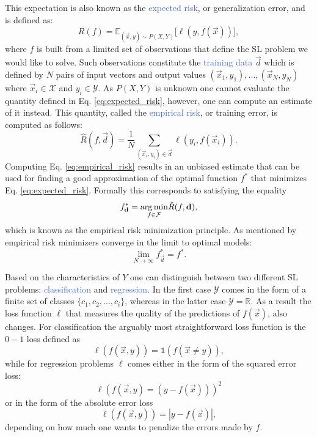 This expectation is also known as the \textcolor{RoyalBlue}{expected risk}, or generalization error, and is defined as:
\begin{equation}
	R(f) = \mathds{E}_{(\vec{x},y)\sim P(X,Y)} \big[\ell(y,f(\vec{x}))\big],
\end{equation}
\label{eq:expected_risk}
where $f$ is built from a limited set of observations that define the SL problem we would like to solve. Such observations constitute the \textcolor{RoyalBlue}{training data} $\vec{d}$ which is defined by $N$ pairs of input vectors and output values $(\vec{x}_1, y_1),...,(\vec{x}_N, y_N)$ where $\vec{x}_i \in \mathcal{X}$ and $y_i \in \mathcal{Y}$. As $P(X,Y)$ is unknown one cannot evaluate the quantity defined in Eq. \ref{eq:expected_risk}, however, one can compute an estimate of it instead. This quantity, called the \textcolor{RoyalBlue}{empirical risk}, or training error, is computed as follows:
\begin{equation}
	\hat{R}(f,\vec{d}) = \frac{1}{N} \sum_{(\vec{x}_i, y_i)\in \vec{d}} \ell(y_i,f(\vec{x}_i)).
\end{equation}
\label{eq:empirical_risk}
Computing Eq. \ref{eq:empirical_risk} results in an unbiased estimate that can be used for finding a good approximation of the optimal function $f^{*}$ that minimizes Eq. \ref{eq:expected_risk}. Formally this corresponds to satisfying the equality
\begin{equation}
	f^{*}_{\mathbf{d}} = \underset{f\in\mathcal{F}}{\operatorname*{arg\,min}}\hat{R}(f,\mathbf{d}),
\end{equation}
which is known as the empirical risk minimization principle. As mentioned by \citet{} empirical risk minimizers converge in the limit to optimal models:
\begin{equation}
	\lim_{N \to \infty} f^{*}_{\vec{d}} = f^{*}.
\end{equation}

Based on the characteristics of $Y$ one can distinguish between two different SL problems: \textcolor{RoyalBlue}{classification} and \textcolor{RoyalBlue}{regression}. In the first case $\mathcal{Y}$ comes in the form of a finite set of classes $\{c_1, c_2,...,c_i\}$, whereas in the latter case $\mathcal{Y}=\mathds{R}$. As a result the loss function $\ell$ that measures the quality of the predictions of $f(\vec{x})$, also changes. For classification the arguably most straightforward loss function is the $0-1$ loss defined as 
\begin{equation}
	\ell(f(\vec{x},y)) = \mathbb{1}(f(\vec{x}\neq y)),
\end{equation}
while for regression problems $\ell$ comes either in the form of the squared error loss:
\begin{equation}
	\ell(f(\vec{x},y)=(y-f(\vec{x})))^2
\end{equation}
or in the form of the absolute error loss
\begin{equation}
	\ell(f(\vec{x},y))=|y-f(\vec{x})|,
\end{equation}
depending on how much one wants to penalize the errors made by $f$.

